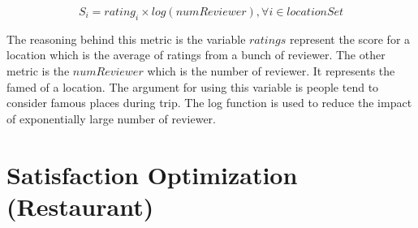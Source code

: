\documentclass{article}
\begin{document}
	$$S_{i} = rating_{i} \times log(numReviewer), \forall i \in locationSet$$
	
	The reasoning behind this metric is the variable $ratings$ represent the score for a location which is the average of ratings from a bunch of reviewer. The other metric is the $numReviewer$ which is the number of reviewer. It represents the famed of a location. The argument for using this variable is people tend to consider famous places during trip. The log function is used to reduce the impact of exponentially large number of reviewer. 
	
	
	
	\pagebreak
	
	\section*{Satisfaction Optimization (Restaurant)}
	
\end{document}
